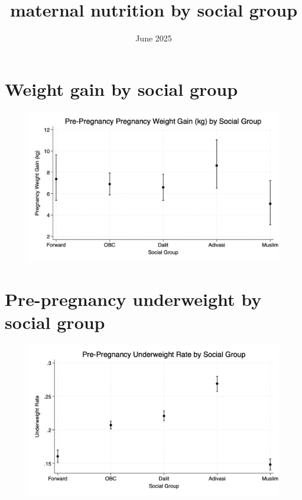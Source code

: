 \documentclass{article}
\title{maternal nutrition by social group}
\date{June 2025}
\begin{document}
\maketitle



\section{Weight gain by social group}

\begin{figure}[H]
    \centering
    \includegraphics[width=\textwidth]{figures/bootstrapped_gainhat_by_group.png}
\end{figure}

\section{Pre-pregnancy underweight by social group}

\begin{figure}[H]
    \centering
    \includegraphics[width=\textwidth]{figures/bootstrapped_underweight_by_group.png}
\end{figure}
\end{document}
